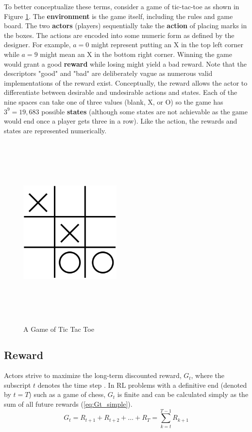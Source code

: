 To better conceptualize these terms, consider a game of tic-tac-toe as shown in Figure \ref{fig:tictactoe}. The \textbf{environment} is the game itself, including the rules and game board. The two \textbf{actors} (players) sequentially take the \textbf{action} of placing marks in the boxes. The actions are encoded into some numeric form as defined by the designer. For example, $a=0$ might represent putting an X in the top left corner while $a=9$ might mean an X in the bottom right corner. Winning the game would grant a good \textbf{reward} while losing might yield a bad reward. Note that the descriptors "good" and "bad" are deliberately vague as numerous valid implementations of the reward exist. Conceptually, the reward allows the actor to differentiate between desirable and undesirable actions and states. Each of the nine spaces can take one of three values (blank, X, or O) so the game has $3^9=19,683$ possible \textbf{states} (although some states are not achievable as the game would end once a player gets three in a row). Like the action, the rewards and states are represented numerically.
\begin{figure}[H]   %
	\centering \includegraphics[width=2in, height=3.85in, keepaspectratio]{figures/tictactoe.pdf}
	\caption{A Game of Tic Tac Toe}\label{fig:tictactoe}
\end{figure}

\subsection{Reward}
Actors strive to maximize the long-term discounted reward, $G_t$, where the subscript $t$ denotes the time step \cite{sutton_2017}. In RL problems with a definitive end (denoted by $t=T$) such as a game of chess, $G_t$ is finite and can be calculated simply as the sum of all future rewards (\ref{eq:Gt_simple}). 
\begin{equation}
	\label{eq:Gt_simple}
	G_t=R_{t+1}+R_{t+2}+\dots + R_{T}=\sum_{k=t}^{T-1} R_{k+1}
\end{equation}

